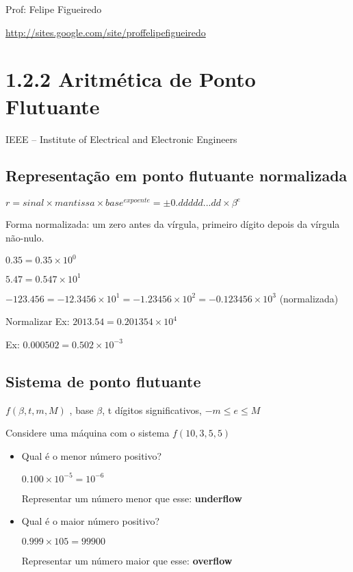 \documentclass[a4paper]{article}
\begin{document}
\parbox[c]{.825\textwidth}{\raggedright%
{Prof: Felipe Figueiredo\par}
{\url{http://sites.google.com/site/proffelipefigueiredo}}

\vspace{1cm}
}



\section*{1.2.2 Aritmética de Ponto Flutuante}
IEEE – Institute of Electrical and Electronic Engineers

\subsection*{Representação em ponto flutuante normalizada}
$r = sinal \times mantissa \times base^{expoente} = \pm 0.ddddd...dd \times \beta ^ e$

Forma normalizada: um zero antes da vírgula, primeiro dígito depois da vírgula não-nulo.

$0.35 = 0.35\times 10^0$

$5.47 = 0.547\times 10^1$

$-123.456 = -12.3456\times 10^1 = -1.23456\times 10^2 = -0.123456\times 10^3$ (normalizada)

Normalizar
Ex: $2013.54 = 0.201354\times 10^4$

Ex: $0.000502 = 0.502\times 10^{-3}$

\subsection*{Sistema de ponto flutuante}
$f(\beta, t, m, M)$ , base $\beta$, t dígitos significativos, $-m \le e \le M$

Considere uma máquina com o sistema $f(10,3,5,5)$
 
\begin{itemize}
\item Qual é o menor número positivo?
 
$0.100\times 10^{-5} = 10^{-6}$

Representar um número menor que esse: {\bf underflow}
 
\item Qual é o maior número positivo?

$0.999\times 105  =99900$

Representar um número maior que esse: {\bf overflow}
\end{itemize}
\end{document}

